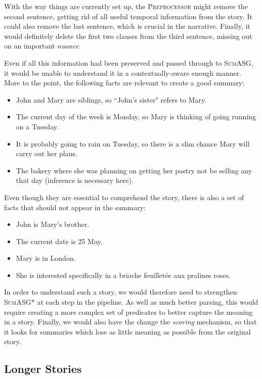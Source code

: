 With the way things are currently set up, the \textsc{Preprocessor} might remove the second sentence, getting rid of all useful temporal information from the story. It could also remove the last sentence, which is crucial in the narrative. Finally, it would definitely delete the first two clauses from the third sentence, missing out on an important \textit{nuance}.

Even if all this information had been preserved and passed through to \textsc{SumASG}, it would be unable to understand it in a contextually-aware enough manner. More to the point, the following facts are relevant to create a good summary:

\begin{itemize}
\item John and Mary are siblings, so ``John's sister" refers to Mary.
\item The current day of the week is Monday, so Mary is thinking of going running on a Tuesday.
\item It is probably going to rain on Tuesday, so there is a slim chance Mary will carry out her plans.
\item The bakery where she was planning on getting her pastry not be selling any that day (inference is necessary here).
\end{itemize}

Even though they are essential to comprehend the story, there is also a set of facts that should not appear in the summary:

\begin{itemize}
\item John is Mary's brother.
\item The current date is 25 May.
\item Mary is in London.
\item She is interested specifically in a brioche feuilletée aux pralines roses.
\end{itemize}

In order to understand such a story, we would therefore need to strengthen \textsc{SumASG*} at each step in the pipeline. As well as much better parsing, this would require creating a more complex set of predicates to better capture the meaning in a story. Finally, we would also have the change the \textit{scoring} mechanism, so that it looks for summaries which lose as little meaning as possible from the original story.

\subsection{Longer Stories}

